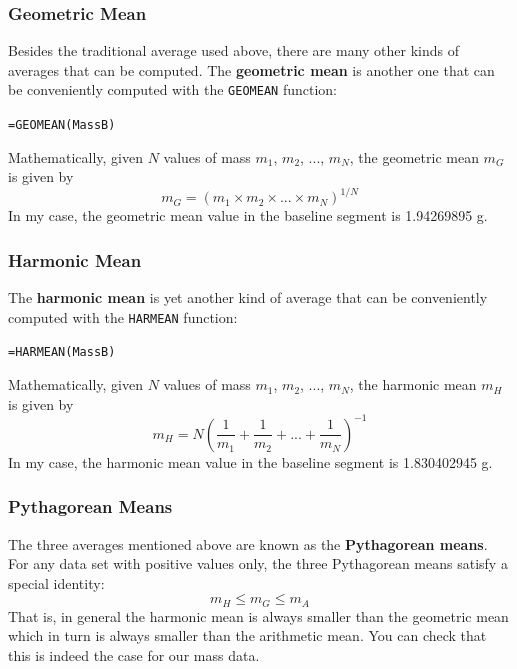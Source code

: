 \subsubsection{Geometric Mean}
Besides the traditional average used above, there are many other kinds of averages that can be computed. The \textbf{geometric mean} is another one that can be conveniently computed with the \texttt{GEOMEAN} function:
\begin{center}
    \texttt{=GEOMEAN(MassB)}
\end{center}
Mathematically, given $N$ values of mass $m_{1}$, $m_{2}$, ..., $m_{N}$, the geometric mean $m_{G}$ is given by
\begin{equation}
    m_{G} = \left( m_{1} \times m_{2} \times ... \times m_{N} \right)^{1/N}
\end{equation}
In my case, the geometric mean value in the baseline segment is 1.94269895 g.
\subsubsection{Harmonic Mean}
The \textbf{harmonic mean} is yet another kind of average that can be conveniently computed with the \texttt{HARMEAN} function:
\begin{center}
    \texttt{=HARMEAN(MassB)}
\end{center}
Mathematically, given $N$ values of mass $m_{1}$, $m_{2}$, ..., $m_{N}$, the harmonic mean $m_{H}$ is given by
\begin{equation}
    m_{H} = N \left( \frac{1}{m_{1}} + \frac{1}{m_{2}} + ... + \frac{1}{m_{N}} \right)^{-1}
\end{equation}
In my case, the harmonic mean value in the baseline segment is 1.830402945 g.
\subsubsection{Pythagorean Means}
The three averages mentioned above are known as the \textbf{Pythagorean means}. For any data set with positive values only, the three Pythagorean means satisfy a special identity:
\begin{equation}
    m_{H} \leq m_{G} \leq m_{A}
\end{equation}
That is, in general the harmonic mean is always smaller than the geometric mean which in turn is always smaller than the arithmetic mean. You can check that this is indeed the case for our mass data.
